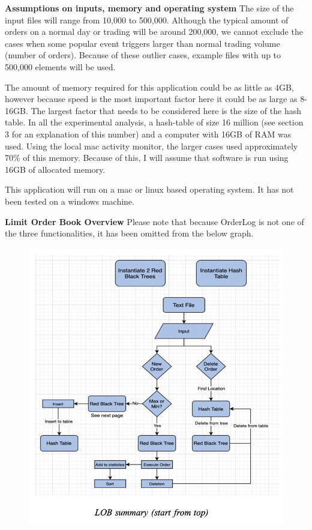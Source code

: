 \documentclass[11p]{article}
\def\nl{\newline}
\begin{document}
\textbf{Assumptions on inputs, memory and operating system} \nl
The size of the input files will range from 10,000 to 500,000. Although the typical amount of orders on a normal day or trading will be around 200,000, we cannot exclude the cases when some popular event triggers larger than normal trading volume (number of orders). Because of these outlier cases, example files with up to 500,000 elements will be used. \bigbreak

The amount of memory required for this application could be as little as 4GB, however because speed is the most important factor here it could be as large as 8-16GB. The largest factor that needs to be considered here is the size of the hash table. In all the experimental analysis, a hash-table of size 16 million (see section 3 for an explanation of this number) and a computer with 16GB of RAM was used. Using the local mac activity monitor, the larger cases used approximately 70\% of this memory. Because of this, I will assume that software is run using 16GB of allocated memory. \bigbreak

This application will run on a mac or linux based operating system. It has not been tested on a windows machine. \bigbreak


\textbf{Limit Order Book Overview} \nl
Please note that because OrderLog is not one of the three functionalities, it has been omitted from the below graph.
\begin{figure}[hbt!]
	\centering
	\includegraphics[width=.6\linewidth]{overallprogram.png}
\end{figure}


\pagebreak
\end{document}

